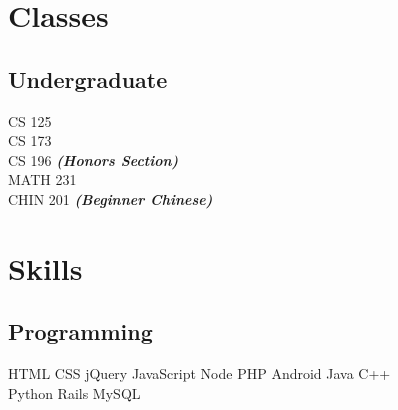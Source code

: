 \documentclass[]{deedy-resume-openfont}
\begin{document}
\begin{minipage}[t]{0.28\textwidth}

\section{Classes}
\subsection{Undergraduate}
CS 125\\
CS 173\\
CS 196
{\footnotesize \textit{\textbf{(Honors Section) }}} \\
MATH 231\\
CHIN 201 {\footnotesize \textit{\textbf{(Beginner Chinese) }}}
\sectionsep


\section{Skills}
\subsection{Programming}
HTML \textbullet{} CSS \textbullet{} jQuery \textbullet{} JavaScript \textbullet{} Node \textbullet{} PHP \textbullet{} Android \textbullet{} Java \textbullet{} C++\\
 Python  \textbullet{} Rails \textbullet{} MySQL
\sectionsep

%
%

\end{minipage} 
\hfill
\end{document}
